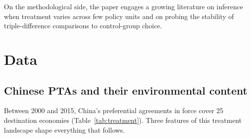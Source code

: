 \documentclass[12pt]{article}
\begin{document}
On the methodological side, the paper engages a growing literature on inference when treatment varies across few policy units \citep{cameron2008, abadie2023, mackinnon2017, conley2011} and on probing the stability of triple-difference comparisons to control-group choice.

\section{Data}\label{sec:background}

\subsection{Chinese PTAs and their environmental content}

Between 2000 and 2015, China's preferential agreements in force cover 25 destination
economies (Table~\ref{tab:treatment}). Three features of this treatment landscape
shape everything that follows.
\end{document}
